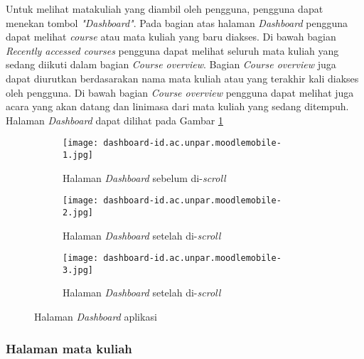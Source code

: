 Untuk melihat matakuliah yang diambil oleh pengguna, pengguna dapat menekan tombol \textit{"Dashboard"}. Pada bagian atas halaman \textit{Dashboard} pengguna dapat melihat \textit{course} atau mata kuliah yang baru diakses. Di bawah bagian \textit{Recently accessed courses} pengguna dapat melihat seluruh mata kuliah yang sedang diikuti dalam bagian \textit{Course overview}. Bagian \textit{Course overview} juga dapat diurutkan berdasarakan nama mata kuliah atau yang terakhir kali diakses oleh pengguna. Di bawah bagian \textit{Course overview} pengguna dapat melihat juga acara yang akan datang dan linimasa dari mata kuliah yang sedang ditempuh. Halaman \textit{Dashboard} dapat dilihat pada Gambar \ref{app:dashboard}

\begin{figure}[H]
	\centering  
	\begin{subfigure}[ht]{.3\textwidth}
	\centering
	\texttt{[image: dashboard-id.ac.unpar.moodlemobile-1.jpg]} 
	\caption{Halaman \textit{Dashboard} sebelum di-\textit{scroll}}
	\end{subfigure}
	\hfill
	\begin{subfigure}[ht]{.3\textwidth}
	\centering
	\texttt{[image: dashboard-id.ac.unpar.moodlemobile-2.jpg]} 
	\caption{Halaman \textit{Dashboard} setelah di-\textit{scroll}}
	\end{subfigure}
	\hfill
	\begin{subfigure}[ht]{.3\textwidth}
	\centering
	\texttt{[image: dashboard-id.ac.unpar.moodlemobile-3.jpg]} 
	\caption{Halaman \textit{Dashboard} setelah di-\textit{scroll}}
	\end{subfigure}

	\caption[Halaman \textit{Dashboard} aplikasi] {Halaman \textit{Dashboard} aplikasi} 
	\label{app:dashboard} 
\end{figure}  

\subsubsection{Halaman mata kuliah}


